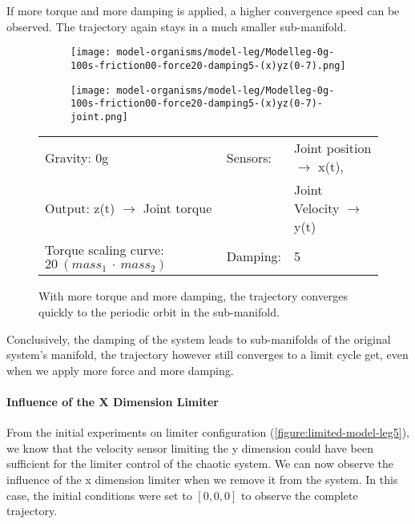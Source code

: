 \documentclass[main]{subfiles}
\begin{document}
If more torque and more damping is applied, a higher convergence speed can be observed. The trajectory again stays in a much smaller sub-manifold.

\begin{figure}[H]
	\centering
		\begin{subfigure}[c]{0.45\textwidth}
	\texttt{[image: model-organisms/model-leg/Modelleg-0g-100s-friction00-force20-damping5-(x)yz(0-7).png]}
		\end{subfigure}
	\begin{subfigure}[c]{0.45\textwidth}
	\texttt{[image: model-organisms/model-leg/Modelleg-0g-100s-friction00-force20-damping5-(x)yz(0-7)-joint.png]}
		\end{subfigure}
	\caption[Highly damped, torque strongly increased, limited chaotic controller controlling model leg]{With more torque and more damping, the trajectory converges quickly to the periodic orbit in the sub-manifold.}
	\begin{tabular}{l|ll}
	\hline 
	Gravity: 0g  & Sensors: & Joint position \(\rightarrow\) x(t),\\
	 Output: z(t) \(\rightarrow\) Joint torque &  & Joint Velocity \(\rightarrow\) y(t) \\
	  Torque scaling curve: \(20~(mass_1~\cdot~mass_2)\) & Damping: & 5 \\
	  \hline
	\end{tabular}

	\label{figure:limited-damped-model-leg-damping4}
\end{figure}

Conclusively, the damping of the system leads to sub-manifolds of the original system's manifold, the trajectory however still converges to a limit cycle get, even when we apply more force and more damping.

\paragraph{Influence of the X Dimension Limiter} From the initial experiments on limiter configuration (\ref{figure:limited-model-leg5}), we know that the velocity sensor limiting the y dimension could have been sufficient for the limiter control of the chaotic system. %
%
We can now observe the influence of the x dimension limiter when we remove it from the system. In this case, the initial conditions were set to \([0,0,0]\) to observe the complete trajectory.
\end{document}

